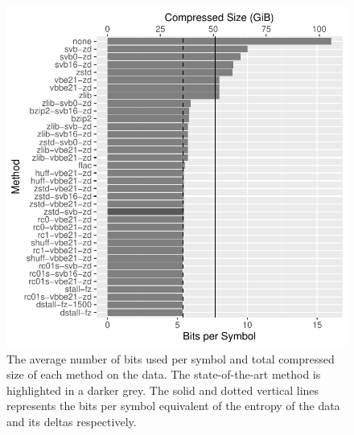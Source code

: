 \begin{figure}
\centering
%
\includegraphics[scale=0.9]{plots/reads.blow5.test.bps.bar.pdf}
	\caption[The average number of bits used per symbol and
	total compressed size of each method on the data.]{\label{fig:results-bps}The average number of bits used per symbol and
	total compressed size of each method on the data. The state-of-the-art
	method is highlighted in a darker grey. The solid and dotted vertical
	lines represents the bits per symbol equivalent of the entropy of the
	data and its deltas respectively.}
\end{figure}
